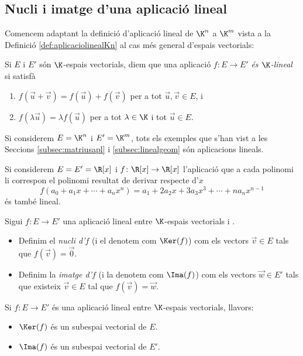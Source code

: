 \subsection{Nucli i imatge d'una aplicació lineal}
Comencem adaptant la definició d'aplicació lineal de $\K^n$ a $\K^m$ vista a la Definició \ref{def:aplicaciolinealKn} al cas més general d'espais vectorials:
\begin{definicio}\label{def:aplicaciolineal}
	Si $E$ i $E'$ són $\K$-espais vectorials, diem que una aplicació $f\colon E \to E'$ \emph{és $\K$-lineal}  si satisfà
	\begin{enumerate}
		\item $f(\vec u+\vec v) = f(\vec u) + f(\vec v)$ per a tot $\vec u, \vec v \in E$, i
		\item $f(\lambda \vec u) = \lambda f(\vec u)$ per a tot $\lambda\in\K$ i tot $\vec u\in E$.
	\end{enumerate}
\end{definicio}
\begin{exemple}
	Si considerem $E=\K^n$ i $E'=\K^m$, tots els exemples que s'han vist a les Seccions \ref{subsec:matriusapl} i \ref{subsec:linealgeom} són aplicacions lineals.
\end{exemple}
\begin{exemple}
	Si considerem $E=E'=\R[x]$ i $f\colon \R[x] \to \R[x]$ l'aplicació que a cada polinomi li correspon el polinomi resultat de derivar respecte d'$x$ 
	$$
	f(a_0+a_1x+\cdots +a_nx^n)=a_1+2a_2x+3a_3x^3+\cdots +na_{n}x^{n-1}
	$$
	és també lineal.
\end{exemple}
\begin{definicio}
	Sigui $f\colon E \to E'$ una aplicació lineal entre $\K$-espais vectorials i .
	\begin{itemize}
		\item Definim el \emph{nucli d'$f$} (i el denotem com $\Ker(f)$) com els vectors $\vec v\in E$ tals que $f(\vec v)=\vec 0$.
		\item Definim la \emph{imatge d'$f$} (i la denotem com $\Ima(f)$) com els vectors $\vec w\in E'$ tals que existeix $\vec v\in E$ tal que $f(\vec v)=\vec w$.
	\end{itemize}
\end{definicio}
\begin{proposicio}
	Si $f \colon E \to E'$ és una aplicació lineal entre $\K$-espais vectorials, llavors:
	\begin{itemize}
		\item $\Ker(f)$ és un subespai vectorial de $E$.
		\item $\Ima(f)$ és un subespai vectorial de $E'$.
	\end{itemize}
\end{proposicio}
